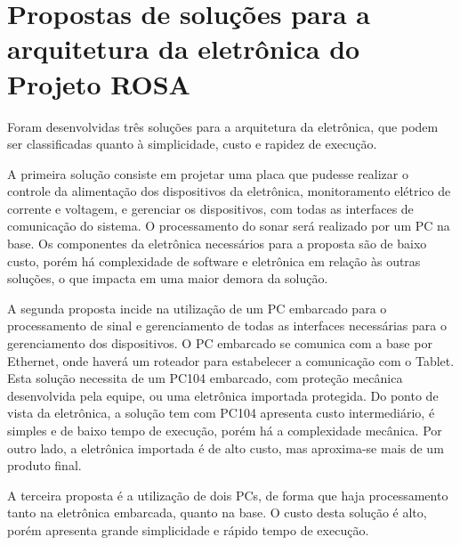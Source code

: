 


\section{Propostas de soluções para a arquitetura da eletrônica do Projeto ROSA}

Foram desenvolvidas três soluções para a arquitetura da eletrônica, que podem ser classificadas quanto à simplicidade, custo e rapidez de execução.

A primeira solução consiste em projetar uma placa que pudesse realizar o
controle da alimentação dos dispositivos da eletrônica, monitoramento elétrico
de corrente e voltagem, e gerenciar os dispositivos, com todas as interfaces de
comunicação do sistema. O processamento do sonar será realizado por um PC na
base. Os componentes da eletrônica necessários para a proposta são de baixo
custo, porém há complexidade de software e eletrônica em relação às outras soluções, o que impacta em uma maior demora da solução.

A segunda proposta incide na utilização de um PC embarcado para o processamento
de sinal e gerenciamento de todas as interfaces necessárias para o
gerenciamento dos dispositivos. O PC embarcado se comunica com a base por
Ethernet, onde haverá um roteador para estabelecer a comunicação com o Tablet.
Esta solução necessita de um PC104 embarcado, com proteção mecânica desenvolvida
pela equipe, ou uma eletrônica importada protegida. Do ponto de
vista da eletrônica, a solução tem com PC104 apresenta custo intermediário, é
simples e de baixo tempo de execução, porém há a complexidade mecânica. Por
outro lado, a eletrônica importada é de alto custo, mas aproxima-se mais de um
produto final. 

A terceira proposta é a utilização de dois PCs, de forma que haja
processamento tanto na eletrônica embarcada, quanto na base. O custo desta solução é alto, porém apresenta grande simplicidade e rápido tempo de execução.

